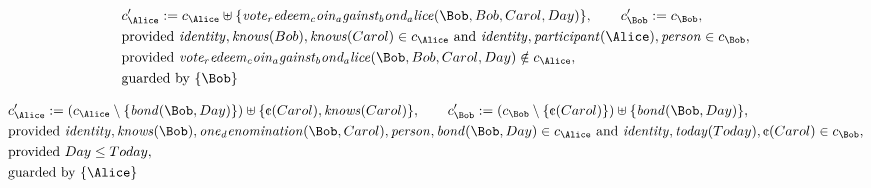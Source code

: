 \fi
\begin{align*}
&
c'_
{
\Alice
}
 := 
c_
{
\Alice
}
 \uplus 
\{
\mathit{
vote_redeem_coin_against_bond_alice
}
(
\Bob
,
Bob
,
Carol
,
Day
)
\}
, \qquad 
c'_
{
\Bob
}
 := 
c_
{
\Bob
}
,\\
&
\text{provided } 
\mathit{
identity
}
,
\mathit{
knows
}
(
Bob
)
,
\mathit{
knows
}
(
Carol
)
 \in c_
{
\Alice
}
 \text{ and } 
\mathit{
identity
}
,
\mathit{
participant
}
(
\Alice
)
,
\mathit{
person
}
 \in c_
{
\Bob
}
,\\
&
\text{provided } 
\mathit{
vote_redeem_coin_against_bond_alice
}
(
\Bob
,
Bob
,
Carol
,
Day
)
 \notin c_
{
\Alice
}
,\\
&
\text{guarded by } \{
\Bob
\}
\end{align*}

\begin{align*}
&
c'_
{
\Alice
}
 := 
(c_
{
\Alice
}
 \setminus 
\{
\mathit{
bond
}
(
\Bob
,
Day
)
\}
) \uplus 
\{
\text{\textcent}
(
Carol
)
,
\mathit{
knows
}
(
Carol
)
\}
, \qquad 
c'_
{
\Bob
}
 := 
(c_
{
\Bob
}
 \setminus 
\{
\text{\textcent}
(
Carol
)
\}
) \uplus 
\{
\mathit{
bond
}
(
\Bob
,
Day
)
\}
,\\
&
\text{provided } 
\mathit{
identity
}
,
\mathit{
knows
}
(
\Bob
)
,
\mathit{
one_denomination
}
(
\Bob
,
Carol
)
,
\mathit{
person
}
,
\mathit{
bond
}
(
\Bob
,
Day
)
 \in c_
{
\Alice
}
 \text{ and } 
\mathit{
identity
}
,
\mathit{
today
}
(
Today
)
,
\text{\textcent}
(
Carol
)
 \in c_
{
\Bob
}
,\\
&
\text{provided } 
Day
\le
Today
,\\
&
\text{guarded by } \{
\Alice
\}
\end{align*}

